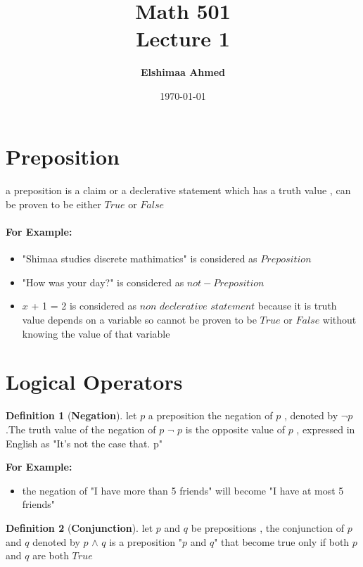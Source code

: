 \documentclass[a4paper]{article}
\begin{document}
\author{\textbf{Elshimaa Ahmed}}
\title{\textbf{Math 501 \\
\large Lecture 1\\}}
\date {\today}
\maketitle
\noindent
\theoremstyle{definition}
\newtheorem{definition}{Definition}[section]
\section{Preposition}
\paragraph{}
  a preposition is a claim or a declerative statement which has a truth value , can be proven to be either $True$ or $False$
\paragraph{For Example: }
\begin{itemize}
    \item "Shimaa studies discrete mathimatics" is considered as $Preposition$
    \item "How was your day?" is considered as $ not-Preposition$
    \item $x$ + 1 = 2 is considered as $non$ $declerative$ $statement$ because it is truth value depends on a variable so cannot be proven to be $True$ or $False$ without knowing the value of that variable 
\end{itemize}
\section{Logical Operators}
     \begin{definition}[\textbf{Negation}]
       let $p$ a preposition the negation of $p$ , denoted by $\neg$$p$ .The truth value of the negation of $p$ $\neg$ $p$ is the opposite value of $p$
       , expressed in English as "It's not the case that. p" 
     \end{definition}
    \textbf{For Example:}
    \begin{itemize}
      \item the negation of "I have more than 5 friends" will become "I have at most 5 friends"
    \end{itemize}

    \begin{definition}[\textbf{Conjunction}]
      let $p$ and $q$ be prepositions , the conjunction of $p$ and $q$ denoted by $p$ $\wedge$ $q$ is a preposition "$p$ and $q$" that become true only if both $p$ and $q$ are both $True$  
    \end{definition}
\end{document}
